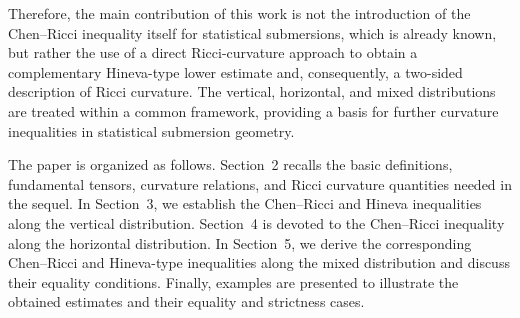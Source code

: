 \documentclass[10pt,a4paper]{article}
\theoremstyle{definition}
\theoremstyle{remark}
\numberwithin{equation}{section}
\begin{document}
Therefore, the main contribution of this work is not the introduction of
the Chen--Ricci inequality itself for statistical submersions, which is
already known, but rather the use of a direct Ricci-curvature approach to
obtain a complementary Hineva-type lower estimate and, consequently, a
two-sided description of Ricci curvature. The vertical, horizontal, and
mixed distributions are treated within a common framework, providing a
basis for further curvature inequalities in statistical submersion
geometry.

The paper is organized as follows. Section~2 recalls the basic definitions,
fundamental tensors, curvature relations, and Ricci curvature quantities
needed in the sequel. In Section~3, we establish the Chen--Ricci and
Hineva inequalities along the vertical distribution. Section~4 is
devoted to the Chen--Ricci inequality along the horizontal distribution.
In Section~5, we derive the corresponding Chen--Ricci and Hineva-type
inequalities along the mixed distribution and discuss their equality
conditions. Finally, examples are presented to illustrate the obtained
estimates and their equality and strictness cases.
\end{document}
